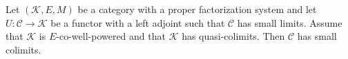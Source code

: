 Let $(\mathcal{K}, E, M)$ be a category with a proper factorization system and let $U: \mathcal{C} \longrightarrow \mathcal{K}$ be a functor with a left adjoint such that $\mathcal{C}$ has small limits. Assume that $\mathcal{K}$ is $E$-co-well-powered and that $\mathcal{K}$ has quasi-colimits. Then $\mathcal{C}$ has small colimits.
